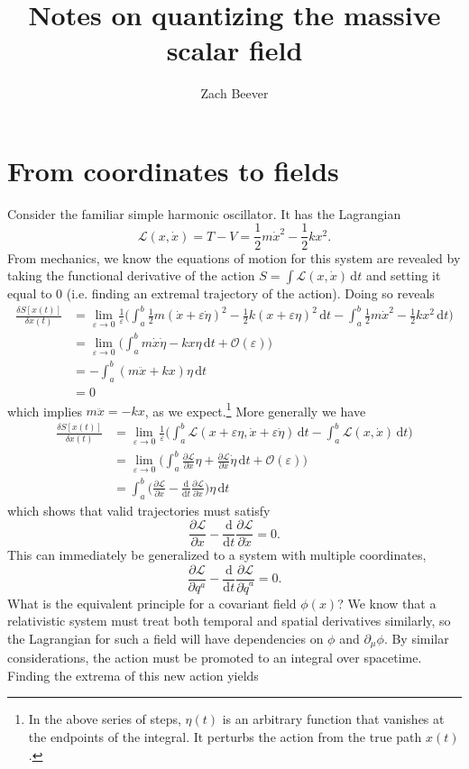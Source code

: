 \documentclass{article}
\author{Zach Beever}
\title{Notes on quantizing the massive scalar field}
\date{}
\begin{document}
	\maketitle
	
	\section{From coordinates to fields}
	
	Consider the familiar simple harmonic oscillator. It has the Lagrangian
	\[
		\mathcal{L}(x, \dot{x}) = T - V = \frac{1}{2}m\dot{x}^2 - \frac{1}{2}kx^2.
	\]
	From mechanics, we know the equations of motion for this system are revealed by taking the functional derivative of the action $S = \int\mathcal{L}(x,\dot{x})\,\mathrm{d}t$  and setting it equal to $0$ (i.e. finding an extremal trajectory of the action). Doing so reveals
	\begin{align*}
		\frac{\delta S[x(t)]}{\delta x(t)} &= \lim_{\varepsilon\to0}\frac{1}{\varepsilon}\Big(\int_a^b\frac{1}{2}m(\dot{x} + \varepsilon\dot{\eta})^2 - \frac{1}{2}k(x+\varepsilon\eta)^2\,\mathrm{d}t - \int_a^b\frac{1}{2}m\dot{x}^2 - \frac{1}{2}kx^2\,\mathrm{d}t\Big) \\
		&= \lim_{\varepsilon\to0}\Big(\int_a^b m\dot{x}\dot{\eta} - kx\eta\,\mathrm{d}t + \mathcal{O}(\varepsilon)\Big) \\
		&= -\int_a^b (m\ddot{x} + kx)\eta\,\mathrm{d}t \\
		&= 0
	\end{align*}
	which implies $m\ddot{x} = -kx$, as we expect.\footnote{In the above series of steps, $\eta(t)$ is an arbitrary function that vanishes at the endpoints of the integral. It perturbs the action from the true path $x(t)$.} More generally we have
	\begin{align*}
		\frac{\delta S[x(t)]}{\delta x(t)} &= \lim_{\varepsilon\to0}\frac{1}{\varepsilon}\Big(\int_a^b\mathcal{L}(x + \varepsilon\eta,\dot{x} + \varepsilon\dot{\eta})\,\mathrm{d}t - \int_a^b\mathcal{L}(x, \dot{x})\,\mathrm{d}t\Big) \\
		&= \lim_{\varepsilon\to0}\Big(\int_a^b\frac{\partial\mathcal{L}}{\partial x}\eta + \frac{\partial\mathcal{L}}{\partial \dot{x}}\dot{\eta}\,\mathrm{d}t + \mathcal{O}(\varepsilon)\Big) \\
		&= \int_a^b\Big(\frac{\partial\mathcal{L}}{\partial x}-\frac{\mathrm{d}}{\mathrm{d}t}\frac{\partial\mathcal{L}}{\partial \dot{x}}\Big)\eta\,\mathrm{d}t
	\end{align*}
	which shows that valid trajectories must satisfy
	\[
		\frac{\partial\mathcal{L}}{\partial x} - \frac{\mathrm{d}}{\mathrm{d}t}\frac{\partial \mathcal{L}}{\partial \dot{x}} = 0.
	\]
	This can immediately be generalized to a system with multiple coordinates,
	\[
		\frac{\partial\mathcal{L}}{\partial q^a} - \frac{\mathrm{d}}{\mathrm{d}t}\frac{\partial \mathcal{L}}{\partial \dot{q}^a} = 0.
	\]
	What is the equivalent principle for a covariant field $\phi(x)$? We know that a relativistic system must treat both temporal and spatial derivatives similarly, so the Lagrangian for such a field will have dependencies on $\phi$ and $\partial_\mu\phi$. By similar considerations, the action must be promoted to an integral over spacetime. Finding the extrema of this new action yields
	
\end{document}
